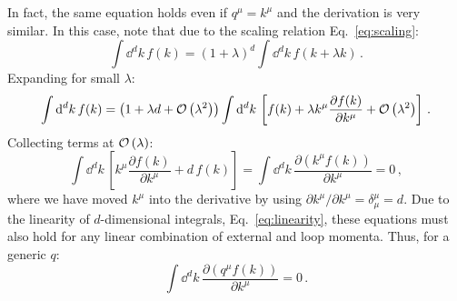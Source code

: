 \documentclass[main.tex]{subfiles}
\begin{document}
In fact, the same equation holds even if $q^\mu = k^\mu$ and the derivation is very similar. In this case, note that due to the scaling relation Eq.~\ref{eq:scaling}:
\begin{equation}
    \int \dd^d k\, f(k) = (1+\lambda)^d \int \dd^d k\, f(k+\lambda k) \,.
\end{equation}
Expanding for small $\lambda$:
\begin{equation}
    \int \mathrm{d}^d k\, f(k) = \left(1+\lambda d + \mathcal{O}\left(\lambda^2\right)\right) \int \mathrm{d}^d k\, \left[ f(k) + \lambda k^\mu \frac{\partial f(k)}{\partial k^\mu} + \mathcal{O}\left(\lambda^2\right) \right]\,.
\end{equation}
Collecting terms at $\mathcal{O}\left(\lambda\right)$:
\begin{equation}
    \int \dd^d k\, \left[ k^\mu \frac{\partial f(k)}{\partial k^\mu} + d\, f(k) \right] = \int \dd^d k\, \frac{\partial(k^\mu f(k))}{\partial k^\mu} = 0\,,
\end{equation}
where we have moved $k^\mu$ into the derivative by using $\partial k^\mu / \partial k^\mu = \delta^\mu_\mu=d$. Due to the linearity of $d$-dimensional integrals, Eq.~\ref{eq:linearity}, these equations must also hold for any linear combination of external and loop momenta. Thus, for a generic $q$:
\begin{equation} \label{eq:IBPboundaryterm}
    \int \dd^d k\, \frac{\partial(q^\mu f(k))}{\partial k^\mu} = 0\,.
\end{equation}
\end{document}
